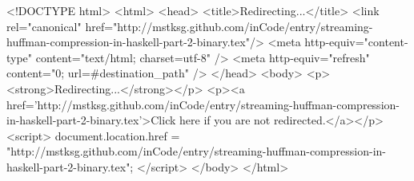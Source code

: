 <!DOCTYPE html>
<html>
<head>
<title>Redirecting...</title>
<link rel="canonical" href="http://mstksg.github.com/inCode/entry/streaming-huffman-compression-in-haskell-part-2-binary.tex"/>
<meta http-equiv="content-type" content="text/html; charset=utf-8" />
<meta http-equiv="refresh" content="0; url=#{destination_path}" />
</head>
<body>
  <p><strong>Redirecting...</strong></p>
  <p><a href='http://mstksg.github.com/inCode/entry/streaming-huffman-compression-in-haskell-part-2-binary.tex'>Click here if you are not redirected.</a></p>
  <script>
    document.location.href = "http://mstksg.github.com/inCode/entry/streaming-huffman-compression-in-haskell-part-2-binary.tex";
  </script>
</body>
</html>
